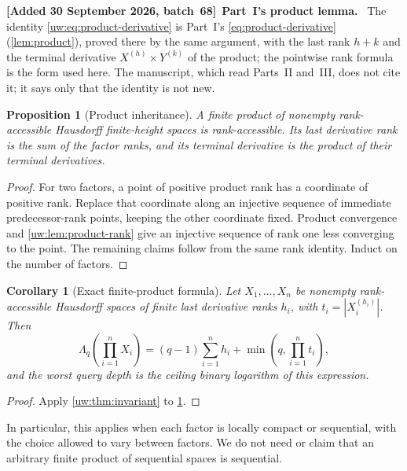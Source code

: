 \documentclass[11pt,letterpaper]{article}
\numberwithin{equation}{section}
\newtheorem{proposition}[proposition]{Proposition}
\newtheorem{corollary}[corollary]{Corollary}
\theoremstyle{definition}
\theoremstyle{remark}
\theoremstyle{definition}
\newenvironment{writenotee}[1][]{\par\smallskip\begingroup\small\sloppy
 \noindent\textbf{[Added 30 September 2026, batch~68]}\if\relax\detokenize{#1}\relax\else~\textbf{#1.}\fi\ }%
 {\par\endgroup\smallskip}
\begin{document}
\begin{writenotee}[Part~I's product lemma]
The identity \eqref{uw:eq:product-derivative} is Part~I's
\eqref{eq:product-derivative} (\cref{lem:product}), proved there by the same
argument, with the last rank $h+k$ and the terminal derivative
$X^{(h)}\times Y^{(k)}$ of the product; the pointwise rank formula is the
form used here. The manuscript, which read Parts~II and~III, does not cite it;
it says only that the identity is not new.
\end{writenotee}

\begin{proposition}[Product inheritance]\label{uw:prop:product-accessible}
A finite product of nonempty rank-accessible Hausdorff finite-height spaces
is rank-accessible. Its last derivative rank is the sum of the factor ranks,
and its terminal derivative is the product of their terminal derivatives.
\end{proposition}
\begin{proof}
For two factors, a point of positive product rank has a coordinate of positive
rank. Replace that coordinate along an injective sequence of immediate
predecessor-rank points, keeping the other coordinate fixed. Product
convergence and \cref{uw:lem:product-rank} give an injective sequence of rank
one less converging to the point. The remaining claims follow from the same
rank identity. Induct on the number of factors.
\end{proof}

\begin{corollary}[Exact finite-product formula]\label{uw:cor:product}
Let $X_1,\ldots,X_n$ be nonempty rank-accessible Hausdorff spaces of finite
last derivative ranks $h_i$, with $t_i=|X_i^{(h_i)}|$. Then
\begin{equation}\label{uw:eq:product-invariant}
 \Lambda_q\!\left(\prod_{i=1}^nX_i\right)
 =(q-1)\sum_{i=1}^nh_i+\min\!\left(q,\prod_{i=1}^nt_i\right),
\end{equation}
and the worst query depth is the ceiling binary logarithm of this expression.
\end{corollary}
\begin{proof}
Apply \cref{uw:thm:invariant} to \cref{uw:prop:product-accessible}.
\end{proof}

In particular, this applies when each factor is locally compact or sequential,
with the choice allowed to vary between factors. We do not need or claim that
an arbitrary finite product of sequential spaces is sequential.
\end{document}
